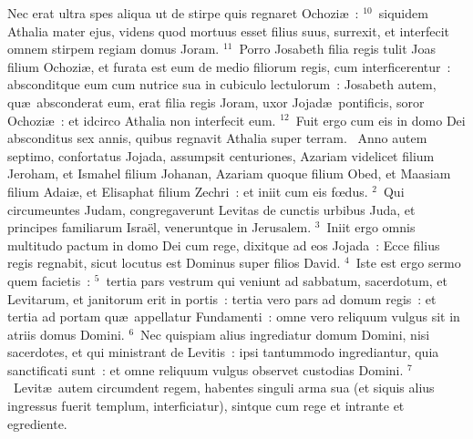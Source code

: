  Nec erat ultra spes aliqua ut de stirpe quis regnaret Ochozi\ae~:
${}^{10}$~siquidem Athalia mater ejus, videns quod mortuus esset filius suus, surrexit, et interfecit omnem stirpem regiam domus Joram.
${}^{11}$~Porro Josabeth filia regis tulit Joas filium Ochozi\ae , et furata est eum de medio filiorum regis, cum interficerentur~: absconditque eum cum nutrice sua in cubiculo lectulorum~: Josabeth autem, qu\ae\ absconderat eum, erat filia regis Joram, uxor Jojad\ae\ pontificis, soror Ochozi\ae~: et idcirco Athalia non interfecit eum.
${}^{12}$~Fuit ergo cum eis in domo Dei absconditus sex annis, quibus regnavit Athalia super terram.
~\lettrine[lines=10,image=true,loversize=0.05,lraise=-0.03]{A}{}nno autem septimo, confortatus Jojada, assumpsit centuriones, Azariam videlicet filium Jeroham, et Ismahel filium Johanan, Azariam quoque filium Obed, et Maasiam filium Adai\ae , et Elisaphat filium Zechri~: et iniit cum eis fœdus.
${}^{2}$~Qui circumeuntes Judam, congregaverunt Levitas de cunctis urbibus Juda, et principes familiarum Isra\"el, veneruntque in Jerusalem.
${}^{3}$~Iniit ergo omnis multitudo pactum in domo Dei cum rege, dixitque ad eos Jojada~: Ecce filius regis regnabit, sicut locutus est Dominus super filios David.
${}^{4}$~Iste est ergo sermo quem facietis~:
${}^{5}$~tertia pars vestrum qui veniunt ad sabbatum, sacerdotum, et Levitarum, et janitorum erit in portis~: tertia vero pars ad domum regis~: et tertia ad portam qu\ae\ appellatur Fundamenti~: omne vero reliquum vulgus sit in atriis domus Domini.
${}^{6}$~Nec quispiam alius ingrediatur domum Domini, nisi sacerdotes, et qui ministrant de Levitis~: ipsi tantummodo ingrediantur, quia sanctificati sunt~: et omne reliquum vulgus observet custodias Domini.
${}^{7}$~Levit\ae\ autem circumdent regem, habentes singuli arma sua (et siquis alius ingressus fuerit templum, interficiatur), sintque cum rege et intrante et egrediente.


